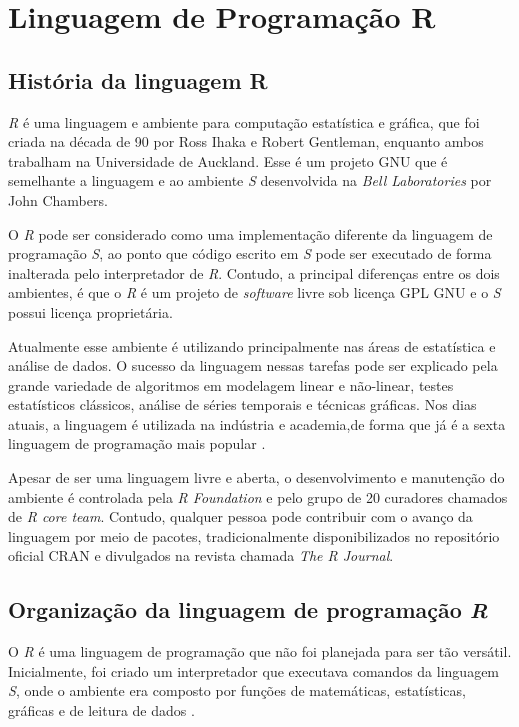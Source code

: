 
\chapter{Linguagem de Programação R}
\label{chap:RProgrammingLanguage}

\section{História da linguagem R}
\textit{R} é uma linguagem e ambiente para computação estatística e gráfica, que foi criada na década de 90 por Ross Ihaka e Robert Gentleman, enquanto ambos trabalham na Universidade de Auckland\cite{Wickham2015}. Esse é um projeto GNU que é semelhante a linguagem e ao ambiente \textit{S} desenvolvida na \textit{Bell Laboratories} por John Chambers. 

O \textit{R} pode ser considerado como uma implementação diferente da linguagem de programação \textit{S}, ao ponto que código escrito em \textit{S} pode ser executado de forma inalterada pelo interpretador de \textit{R}. Contudo, a principal diferenças entre os dois ambientes, é que o \textit{R} é um projeto de \textit{software} livre sob licença GPL GNU e o \textit{S} possui licença proprietária\cite{Wickham2015}.

Atualmente esse ambiente é utilizando principalmente nas áreas de estatística e análise de dados. O sucesso da linguagem nessas tarefas pode ser explicado pela grande variedade de  algoritmos em modelagem linear e não-linear, testes estatísticos clássicos, análise de séries temporais e técnicas gráficas. Nos dias atuais, a linguagem é utilizada na indústria e academia,de forma que já é a sexta linguagem de programação mais popular \cite{Cass2017}.

Apesar de ser uma linguagem livre e aberta, o desenvolvimento e manutenção do ambiente é controlada pela \textit{R Foundation} e pelo grupo de 20 curadores chamados de \textit{R core team}. Contudo, qualquer pessoa pode contribuir com o avanço da linguagem por meio de pacotes, tradicionalmente disponibilizados no repositório oficial CRAN e divulgados na revista chamada \textit{The R Journal}.


\section{Organização da linguagem de programação \textit{R}}
O \textit{R} é uma linguagem de programação que não foi planejada para ser tão versátil. Inicialmente, foi criado um interpretador que executava comandos da linguagem \textit{S}, onde o ambiente era composto por funções de matemáticas, estatísticas, gráficas e de leitura de dados \cite{R-project}.

